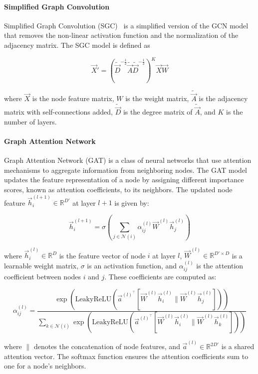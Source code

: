 \paragraph{Simplified Graph Convolution}

Simplified Graph Convolution (SGC)~\cite{wu2019simplifying} is a simplified version of the GCN model that removes the non-linear activation function and the normalization of the adjacency matrix. The SGC model is defined as

$$
 \vec{X}' = (\tilde{\vec{D}}^{-\frac{1}{2}}\tilde{\vec{A}}\tilde{\vec{D}}^{-\frac{1}{2}})^K \vec{X}\vec{W}
$$

where $\vec{X}$ is the node feature matrix, $W$ is the weight matrix, $\tilde{\vec{A}}$ is the adjacency matrix with self-connections added, $\tilde{\vec{D}}$ is the degree matrix of $\tilde{\vec{A}}$, and $K$ is the number of layers. 


\paragraph{Graph Attention Network}
Graph Attention Network (GAT) \cite{velivckovic2017graph} is a class of neural networks that use attention mechanisms to aggregate information from neighboring nodes. The GAT model updates the feature representation of a node by assigning different importance scores, known as attention coefficients, to its neighbors. The updated node feature $\vec{h}_i^{(l+1)} \in \mathbb{R}^{D'}$ at layer $l+1$ is given by:

$$
\vec{h}_i^{(l+1)} = \sigma \left( \sum_{j \in \mathcal{N}(i)} \alpha_{ij}^{(l)} \vec{W}^{(l)} \vec{h}_j^{(l)} \right)
$$

where $\vec{h}_i^{(l)} \in \mathbb{R}^D$ is the feature vector of node $i$ at layer $l$, $\vec{W}^{(l)} \in \mathbb{R}^{D' \times D}$ is a learnable weight matrix, $\sigma$ is an activation function, and $\alpha_{ij}^{(l)}$ is the attention coefficient between nodes $i$ and $j$. These coefficients are computed as:

$$
\alpha_{ij}^{(l)} = \frac{\exp \left( \textrm{LeakyReLU} \left( \vec{a}^{(l)^\top} [\vec{W}^{(l)} \vec{h}_i^{(l)} \| \vec{W}^{(l)} \vec{h}_j^{(l)}] \right) \right)}{\sum_{k \in \mathcal{N}(i)} \exp \left( \textrm{LeakyReLU} \left( \vec{a}^{(l)^\top} [\vec{W}^{(l)} \vec{h}_i^{(l)} \| \vec{W}^{(l)} \vec{h}_k^{(l)}] \right) \right)}
$$

where $\|$ denotes the concatenation of node features, and $\vec{a}^{(l)} \in \mathbb{R}^{2D'}$ is a shared attention vector. The softmax function ensures the attention coefficients sum to one for a node's neighbors.




